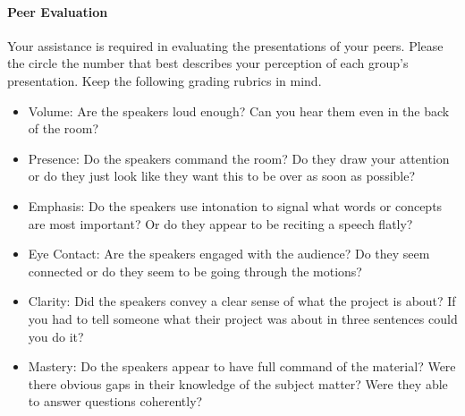 \documentclass[10pt]{article}
\begin{document}

\newcommand{\grademe}[2]{
\begin{table}[h!]
	\centering
	\begin{tabular}{|c|c|c|c|c|c|p{2.5in}|}
	\hline
	Criteria & Poor & Fair & Average & Good & Excellent & Comments \\
	\hline
	Volume 		& 1 & 2 & 3 & 4 & 5 & \\[1.5ex]
	Presence 	& 1 & 2 & 3 & 4 & 5 & \\[1.5ex]
	Emphasis 	& 1 & 2 & 3 & 4 & 5 & \\[1.5ex]
	Eye Contact & 1 & 2 & 3 & 4 & 5 & \\[1.5ex]
	Clarity 	& 1 & 2 & 3 & 4 & 5 & \\[1.5ex]
	Mastery		& 1 & 2 & 3 & 4 & 5 & \\[1.5ex]
	\hline
	\end{tabular}
	\caption{Group #1 - #2}
\end{table}
}


\paragraph{Peer Evaluation}

Your assistance is required in evaluating the presentations of your peers. Please the circle the number that best describes your perception of each group's presentation. Keep the following grading rubrics in mind. 

\begin{itemize}
	\item Volume: Are the speakers loud enough? Can you hear them even in the back of the room? 
	\item Presence: Do the speakers command the room? Do they draw your attention or do they just look like they want this to be over as soon as possible?
	\item Emphasis: Do the speakers use intonation to signal what words or concepts are most important? Or do they appear to be reciting a speech flatly?
	\item Eye Contact: Are the speakers engaged with the audience? Do they seem connected or do they seem to be going through the motions?	
	\item Clarity: Did the speakers convey a clear sense of what the project is about? If you had to tell someone what their project was about in three sentences could you do it? 
	\item Mastery: Do the speakers appear to have full command of the material? Were there obvious gaps in their knowledge of the subject matter? Were they able to answer questions coherently? 	
\end{itemize}
\end{document}
